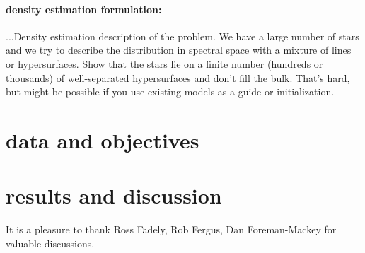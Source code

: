 \documentclass[12pt, preprint]{aastex}
\begin{document}
\paragraph{density estimation formulation:}
...Density estimation description of the problem.  We have a large
number of stars and we try to describe the distribution in spectral
space with a mixture of lines or hypersurfaces.  Show that the stars
lie on a finite number (hundreds or thousands) of well-separated
hypersurfaces and don't fill the bulk.  That's hard, but might be
possible if you use existing models as a guide or initialization.

\section{data and objectives}

\section{results and discussion}

\acknowledgements It is a pleasure to thank
  Ross Fadely,
  Rob Fergus,
  Dan Foreman-Mackey
for valuable discussions.
\end{document}

